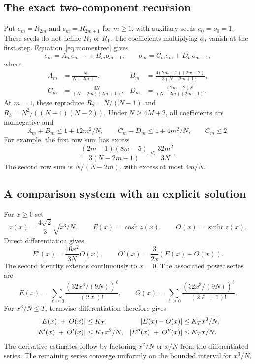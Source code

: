 \documentclass[11pt]{article}
\theoremstyle{definition}
\theoremstyle{remark}
\newcommand{\1}{\mathbf 1}
\newcommand{\shc}{\operatorname{sinhc}}
\begin{document}
\subsection{The exact two-component recursion}

Put $e_m=R_{2m}$ and $o_m=R_{2m+1}$ for $m\ge1$, with auxiliary seeds $e_0=o_0=1$. These seeds do not define $R_0$ or $R_1$. The coefficients multiplying $o_0$ vanish at the first step. Equation~\eqref{eq:momentrec} gives
\begin{equation}\label{eq:tworec}
e_m=A_me_{m-1}+B_mo_{m-1},\qquad
o_m=C_me_m+D_mo_{m-1},
\end{equation}
where
\begin{align*}
A_m&=\frac N{N-2m+1},&
B_m&=\frac{4(2m-1)(2m-2)}{3(N-2m+1)},\\
C_m&=\frac{3N}{(N-2m)(2m+1)},&
D_m&=\frac{(2m-2)N}{(N-2m)(2m+1)}.
\end{align*}
At $m=1$, these reproduce $R_2=N/(N-1)$ and $R_3=N^2/((N-1)(N-2))$. Under $N\ge4M+2$, all coefficients are nonnegative and
\begin{equation}\label{eq:rowsums}
A_m+B_m\le1+12m^2/N,\qquad
C_m+D_m\le1+4m^2/N,\qquad C_m\le2.
\end{equation}
For example, the first row sum has excess
\[
\frac{(2m-1)(8m-5)}{3(N-2m+1)}\le\frac{32m^2}{3N}.
\]
The second row sum is $N/(N-2m)$, with excess at most $4m/N$.

\subsection{A comparison system with an explicit solution}

For $x\ge0$ set
\[
z(x)=\frac{4\sqrt2}{3}\sqrt{x^3/N},\qquad
E(x)=\cosh z(x),\qquad O(x)=\shc z(x).
\]
Direct differentiation gives
\begin{equation}\label{eq:ode}
E'(x)=\frac{16x^2}{3N}O(x),\qquad
O'(x)=\frac3{2x}(E(x)-O(x)).
\end{equation}
The second identity extends continuously to $x=0$. The associated power series are
\[
E(x)=\sum_{\ell\ge0}\frac{(32x^3/(9N))^\ell}{(2\ell)!},\qquad
O(x)=\sum_{\ell\ge0}\frac{(32x^3/(9N))^\ell}{(2\ell+1)!}.
\]
For $x^3/N\le T$, termwise differentiation therefore gives
\begin{align}
|E(x)|+|O(x)|&\le K_T,&
|E(x)-O(x)|&\le K_Tx^3/N,\notag\\
|E'(x)|+|O'(x)|&\le K_Tx^2/N,&
|E''(x)|+|O''(x)|&\le K_Tx/N.\label{eq:derivatives}
\end{align}
The derivative estimates follow by factoring $x^2/N$ or $x/N$ from the differentiated series. The remaining series converge uniformly on the bounded interval for $x^3/N$.
\end{document}
